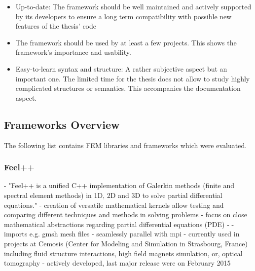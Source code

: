 \documentclass[11pt,twoside]{scrartcl}
\begin{document}
\begin{itemize}
 \item Up-to-date: The framework should be well maintained and actively supported by its developers to ensure a long term compatibility with possible new features of the thesis' code
 \item The framework should be used by at least a few projects. This shows the framework's importance and usability. %
 \item Easy-to-learn syntax and structure: A rather subjective aspect but an important one. The limited time for the thesis does not allow to study highly complicated structures or semantics. This accompanies the documentation aspect.
 \end{itemize}
 \subsection{Frameworks Overview}
 The following list contains FEM libraries and frameworks which were evaluated.
  \subsubsection{Feel++}
  - "Feel++ is a unified C++ implementation of Galerkin methods (finite and spectral element methods) in 1D, 2D and 3D to solve partial differential equations."\cite{feelpp}\newline
  - creation of versatile mathematical kernels allow testing and comparing different techniques and methods in solving problems\newline
  - focus on close mathematical abstractions regarding partial differential equations (PDE)\newline
  - \cite{prud2012feel++}
  - imports e.g. gmsh mesh files\newline
  - seamlessly parallel with mpi\newline
  - currently used in projects at Cemosis (Center for Modeling and Simulation in Strasbourg, France) including fluid structure interactions, high field magnets simulation, or, optical tomography\newline
  - actively developed, last major release were on February 2015
\end{document}
